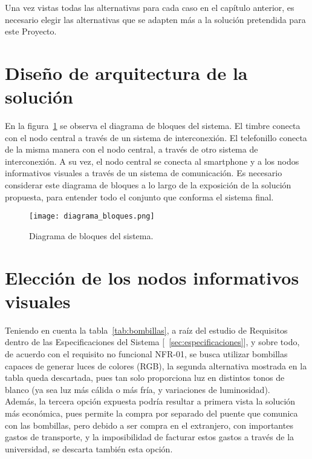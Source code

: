 \label{cap:solucion}

Una vez vistas todas las alternativas para cada caso en el capítulo anterior, es necesario elegir las alternativas que se adapten más a la solución pretendida para este Proyecto.

\section{Diseño de arquitectura de la solución}

    En la figura~\ref{diagrama_bloques} se observa el diagrama de bloques del sistema. El timbre conecta con el nodo central a través de un sistema de interconexión. El telefonillo conecta de la misma manera con el nodo central, a través de otro sistema de interconexión. A su vez, el nodo central se conecta al smartphone y a los nodos informativos visuales a través de un sistema de comunicación. Es necesario considerar este diagrama de bloques a lo largo de la exposición de la solución propuesta, para entender todo el conjunto que conforma el sistema final. \\

    \begin{figure}[H]
      \centering
        \texttt{[image: diagrama\_bloques.png]}
      \caption{Diagrama de bloques del sistema.}
      \label{diagrama_bloques}
    \end{figure}

\section{Elección de los nodos informativos visuales}
    \label{sec:solucionbombillas}

    Teniendo en cuenta la tabla~\ref{tab:bombillas}, a raíz del estudio de Requisitos dentro de las Especificaciones del Sistema [~\ref{sec:especificaciones}], y sobre todo, de acuerdo con el requisito no funcional NFR-01, se busca utilizar bombillas capaces de generar luces de colores (RGB), la segunda alternativa mostrada en la tabla queda descartada, pues tan solo proporciona luz en distintos tonos de blanco (ya sea luz más cálida o más fría, y variaciones de luminosidad). \\

    Además, la tercera opción expuesta podría resultar a primera vista la solución más económica, pues permite la compra por separado del puente que comunica con las bombillas, pero debido a ser compra en el extranjero, con importantes gastos de transporte, y la imposibilidad de facturar estos gastos a través de la universidad, se descarta también esta opción. \\

